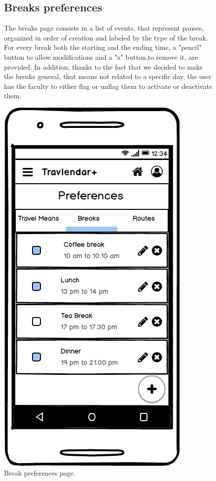 		\begin{figure}
				\begin{flushleft}
				\subsection{Breaks preferences}
				The breaks page consists in a list of events, that represent pauses, organized in order of creation and labeled by the type of the break. For every break  both the starting and the ending time, a "pencil" button to allow modifications and a "x" button,to remove it, are provided. In addition, thanks to the fact that we decided to make the breaks general, that means not related to a specific day, the user has the faculty to either flag or unflag them to activate or deactivate them. 
			\end{flushleft}
		\centering
		\includegraphics[width=0.6\linewidth]{mockups/PreferencesBreaks}
		\caption{Break preferences page.}
		\label{fig:preferencesbreaks}
	\end{figure}
	
